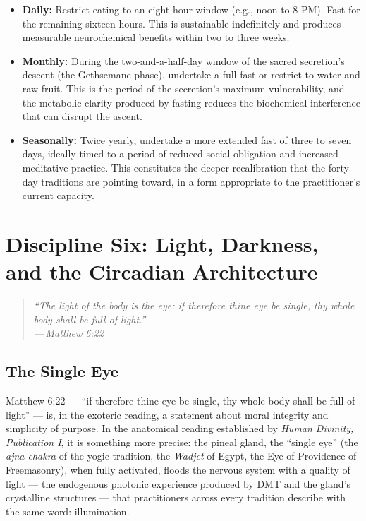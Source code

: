 \documentclass[12pt, a4paper]{article}
\newcommand{\epigraph}[2]{%
  \begin{quote}
    \itshape ``#1''\\[0.3em]
    \normalfont\small\hfill ---\,#2
  \end{quote}
}
\begin{document}
\begin{itemize}[leftmargin=1.5cm]
  \item \textbf{Daily:} Restrict eating to an eight-hour window (e.g., noon
  to 8 PM). Fast for the remaining sixteen hours. This is sustainable
  indefinitely and produces measurable neurochemical benefits within two to
  three weeks.
  \item \textbf{Monthly:} During the two-and-a-half-day window of the sacred
  secretion's descent (the Gethsemane phase), undertake a full fast or
  restrict to water and raw fruit. This is the period of the secretion's
  maximum vulnerability, and the metabolic clarity produced by fasting reduces
  the biochemical interference that can disrupt the ascent.
  \item \textbf{Seasonally:} Twice yearly, undertake a more extended fast of
  three to seven days, ideally timed to a period of reduced social obligation
  and increased meditative practice. This constitutes the deeper recalibration
  that the forty-day traditions are pointing toward, in a form appropriate to
  the practitioner's current capacity.
\end{itemize}

\section{Discipline Six: Light, Darkness, and the Circadian Architecture}
\label{sec:light}

\epigraph{The light of the body is the eye: if therefore thine eye be single,
thy whole body shall be full of light.}{Matthew 6:22}

\subsection{The Single Eye}

Matthew 6:22 — ``if therefore thine eye be single, thy whole body shall be
full of light'' — is, in the exoteric reading, a statement about moral
integrity and simplicity of purpose. In the anatomical reading established by
\emph{Human Divinity, Publication I}, it is something more precise: the pineal gland,
the ``single eye'' (the \emph{ajna chakra} of the yogic tradition, the
\emph{Wadjet} of Egypt, the Eye of Providence of Freemasonry), when fully
activated, floods the nervous system with a quality of light — the endogenous
photonic experience produced by DMT and the gland's crystalline structures —
that practitioners across every tradition describe with the same word:
illumination.
\end{document}
